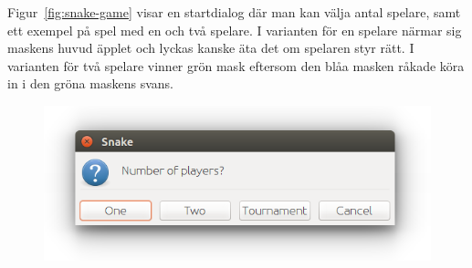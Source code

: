 Figur~\ref{fig:snake-game} visar en startdialog där man kan välja antal spelare, samt ett exempel på spel med en och två spelare. I varianten för en spelare närmar sig maskens huvud äpplet och lyckas kanske äta det om spelaren styr rätt.  I varianten för två spelare vinner grön mask eftersom den blåa masken råkade köra in i den gröna maskens svans.
\begin{figure}[H]
\begin{minipage}{0.45\textwidth}
\includegraphics[width=1.0\textwidth]{../img/snake-start}


\end{minipage}
\end{figure}
